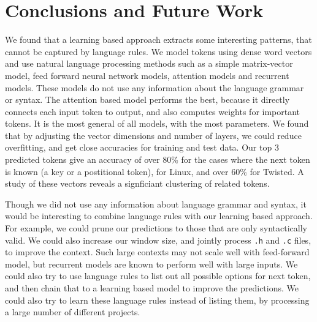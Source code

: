 \section{Conclusions and Future Work}
\label{sec:conclusions}

We found that a learning based approach extracts some interesting patterns,
that cannot be captured by language rules.
We model tokens using dense word vectors and use natural language processing
methods such as 
a simple matrix-vector model, feed forward neural network models,
attention models and recurrent models.
These models do not use any information about the language grammar or syntax.
The attention based model performs the best, because it directly connects each
input token to output, and also computes weights for important tokens. It is
the most general of all models, with the most parameters.
We found that by adjusting the vector dimensions and number of layers, we could
reduce overfitting, and get close accuracies for training and test data.
Our top 3 predicted tokens give an accuracy of over 80\% for the cases where
the next token is known (a key or a postitional token), for Linux,
and over 60\% for Twisted.
A study of these vectors reveals a signficiant clustering of related tokens.

Though we did not use any information about language grammar and syntax, it
would be interesting to combine language rules with our learning based
approach. For example, we could prune our predictions to those that are only
syntactically valid. We could also increase our window size, and jointly
process \texttt{.h} and \texttt{.c} files, to improve the context. Such large
contexts may not scale well with feed-forward model, but recurrent models are
known to perform well with large inputs. We could also try to use language
rules to list out all possible options for next token, and then chain that to a
learning based model to improve the predictions. We could also try to learn
these language rules instead of listing them, by processing a large number of
different projects.

